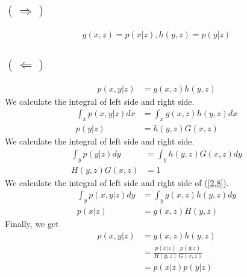 \documentclass{jsarticle}
\begin{document}
\subsection*{$(\Rightarrow)$}
\begin{align}
g(x,z)=p(x|z), h(y,z)=p(y|z)
\end{align}
\subsection*{$(\Leftarrow)$}
\begin{align}
p(x,y|z) & = g(x,z)h(y,z) \label{2.8}
\end{align}
We calculate the integral of left side and right side.
\begin{align}
\int_{x}p(x,y|z)dx & =\int_{x}g(x,z)h(y,z)dx\\
p(y|z) & = h(y,z)G(x,z) 
\end{align}
We calculate the integral of left side and right side.
\begin{align}
\int_{y}p(y|z)dy & =\int_{y}h(y,z)G(x,z)dy\\
H(y,z)G(x,z) & = 1
\end{align}
We calculate the integral of left side and right side of (\ref{2.8}).
\begin{align}
\int_{y}p(x,y|z)dy & = \int_{y}g(x,z)h(y,z)dy \\
p(x|z) & =g(x,z)H(y,z)
\end{align}
Finally, we get
\begin{align}
p(x,y|z) & = g(x,z)h(y,z)\\
& = \frac{p(x|z)}{H(y,z)}\frac{p(y|z)}{G(x,z)} \\
& = p(x|z)p(y|z)
\end{align}
\end{document}
